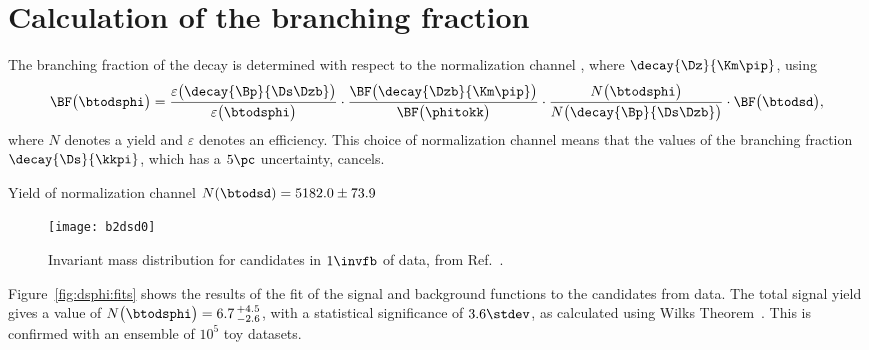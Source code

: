 \section{Calculation of the branching fraction}
\label{sec:dsphi:bf}
The branching fraction of the decay \btodsphi is determined with respect to the normalization
channel \btodsd, where $\decay{\Dz}{\Km\pip}$, using
\begin{equation}
  \BF\big(\btodsphi\big) =
  \frac{\varepsilon\big(\decay{\Bp}{\Ds\Dzb}\big)}{\varepsilon\big(\btodsphi\big)}
  \cdot
  \frac{\BF\big(\decay{\Dzb}{\Km\pip}\big)}{\BF\big(\phitokk\big)}
  \cdot
  \frac{N\big(\btodsphi\big)}{N\big(\decay{\Bp}{\Ds\Dzb}\big)}
  \cdot
  \BF\big(\btodsd\big)
  , \\
  \label{eq:dsphi:bf}
\end{equation}
where $N$ denotes a yield and $\varepsilon$ denotes an efficiency.
This choice of normalization channel means that the values of the branching fraction
$\decay{\Ds}{\kkpi}$, which has a $5\pc$ uncertainty, cancels.

Yield of normalization channel
$N(\btodsd) = 5182.0\pm73.9$

\begin{figure}
  \begin{center}
    \texttt{[image: b2dsd0]}
    \caption[Fit to the normalization channel \btodsd]
    {\small
      Invariant mass distribution for \btodsd candidates in $1\invfb$ of \lhcb data, from
      Ref.~\protect\cite{LHCb-CONF-2012-009}.
    }
    \label{fig:dsphi:dsd}
  \end{center}
\end{figure}







Figure~\ref{fig:dsphi:fits} shows the results of the fit of the signal and background functions to
the \btodsphi candidates from data.
The total signal yield gives a value of $N\big(\btodsphi\big)=6.7\,^{+4.5}_{-2.6}$, with a
statistical significance of $3.6\stdev$, as calculated using Wilks Theorem~\cite{wilks1938}.
This is confirmed with an ensemble of $10^5$ toy datasets.

